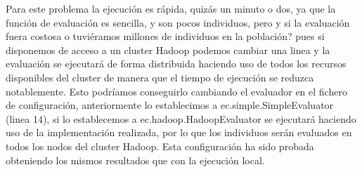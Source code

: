 Para este problema la ejecuci\'on es rápida, quizás un minuto o dos, ya que la función de evaluación es sencilla, y son pocos individuos, pero y si la evaluación fuera costosa o tuviéramos millones de individuos en la población? pues si disponemos de acceso a un cluster Hadoop podemos cambiar una linea y la evaluación se ejecutar\'a de forma distribuida haciendo uso de todos los recursos disponibles del cluster de manera que el tiempo de ejecución se reduzca notablemente. Esto podríamos conseguirlo cambiando el evaluador en el fichero de configuración, anteriormente lo establecimos a ec.simple.SimpleEvaluator (linea 14), si lo establecemos a ec.hadoop.HadoopEvaluator se ejecutar\'a haciendo uso de la implementación realizada, por lo que los individuos serán evaluados en todos los nodos del cluster Hadoop. Esta configuraci\'on ha sido probada obteniendo los mismos resultados que con la ejecución local.



















